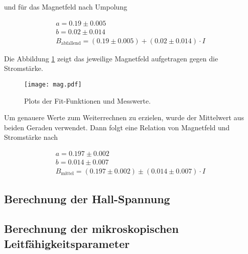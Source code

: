 und für das Magnetfeld nach Umpolung

\begin{align*}
a = 0.19 \pm 0.005\\
b = 0.02 \pm 0.014\\
B_{\text{abfallend}} = (0.19 \pm 0.005) + (0.02 \pm 0.014) \cdot I
\end{align*}

\noindent Die Abbildung \ref{fig:plots} zeigt das jeweilige Magnetfeld aufgetragen gegen die Stromstärke. 

\begin{figure}
 \centering
 \texttt{[image: mag.pdf]}
 \caption{Plots der Fit-Funktionen und Messwerte.}
 \label{fig:plots}
\end{figure} 
\FloatBarrier
\noindent Um genauere Werte zum Weiterrechnen zu erzielen, wurde der Mittelwert aus
beiden Geraden verwendet. Dann folgt eine Relation von Magnetfeld und Stromstärke nach

\begin{align*}
a = 0.197 \pm 0.002\\
b = 0.014 \pm 0.007\\
B_{\text{mittel}} = (0.197 \pm 0.002) \pm (0.014 \pm 0.007) \cdot I
\end{align*}

\subsection{Berechnung der Hall-Spannung}


\subsection{Berechnung der mikroskopischen Leitfähigkeitsparameter}